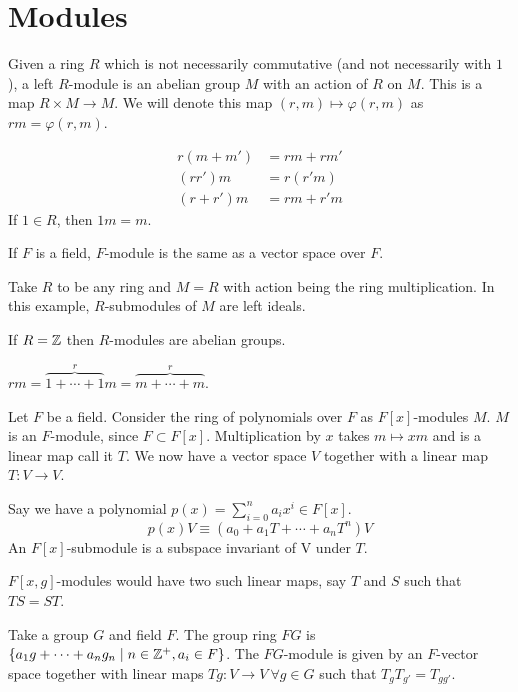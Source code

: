 \documentclass[a4paper,twoside,master.tex]{subfiles}
\begin{document}

\section{Modules}\label{sec:modules}

\begin{definition}
    Given a ring $ R $ which is not necessarily commutative (and not necessarily with $ 1 $), a left $ R $-module is an abelian group $ M $ with an action of $ R $ on $ M $. This is a map $ R \times M \to M $. We will denote this map $ (r,m) \mapsto \varphi(r,m) $ as $ rm = \varphi(r,m) $.

    \begin{align}
        r(m + m') &= rm + rm'\\
        (rr')m &= r(r'm)\\
        (r+r')m &= rm+r'm
    \end{align}
    If $ 1 \in R $, then $ 1m = m $.
\end{definition}


\begin{ex}
    If $ F $ is a field, $ F $-module is the same as a vector space over $ F $.
\end{ex}
\begin{ex}
    Take $ R $ to be any ring and $ M = R $ with action being the ring multiplication. In this example, $ R $-submodules of $ M $ are left ideals.
\end{ex}
\begin{ex}
    If $ R = \mathbb{Z} $ then $ R $-modules are abelian groups.

    $ r m = \overbrace{1+\cdots+1}^r m = \overbrace{m+\cdots+m}^r $.
\end{ex}
\begin{ex}
    Let $ F $ be a field. Consider the ring of polynomials over $ F $ as $ F[x] $-modules $ M $. $ M $ is an $ F $-module, since $ F \subset F[x] $. Multiplication by $ x $ takes $ m \mapsto xm $ and is a linear map\textemdash{} call it $ T $. We now have a vector space $ V $ together with a linear map $ T\colon V \to V $.

    Say we have a polynomial $ p(x) = \sum_{i=0}^{n} a_i x^i \in F[x] $.
    \begin{equation}
        p(x) V \equiv (a_0 + a_1 T + \cdots + a_n T^n)V
    \end{equation}
    An $ F[x] $-submodule is a subspace invariant of V under $ T $.
\end{ex}
\begin{ex}
    $ F[x,g] $-modules would have two such linear maps, say $ T $ and $ S $ such that $ TS = ST $.
\end{ex}
\begin{ex}
    Take a group $ G $ and field $ F $. The group ring $ FG $ is $ \{a_1 g + \cdots + a_n g_n \mid n \in \mathbb{Z}^+, a_i \in F\} $. The $ FG $-module is given by an $ F $-vector space together with linear maps $ Tg\colon V \to V\ \forall g \in G $ such that $ T_g T_{g'} = T_{gg'} $.
\end{ex}
\end{document}
